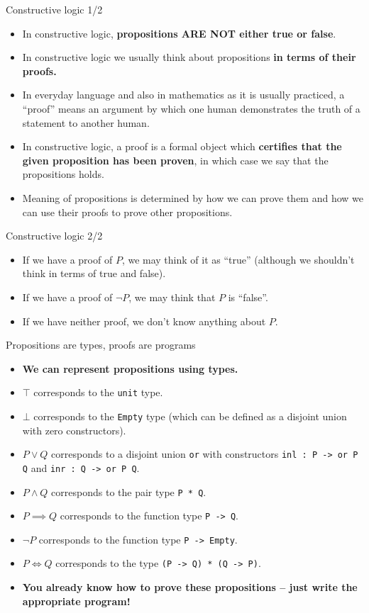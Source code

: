 \documentclass{beamer}
\newcommand{\m}[1]{\texttt{#1}}
\begin{document}
\begin{frame}{Constructive logic 1/2}
\begin{itemize}
	\item In constructive logic, \textbf{propositions ARE NOT either true or false}.
	\item In constructive logic we usually think about propositions \textbf{in terms of their proofs.}
	\item In everyday language and also in mathematics as it is usually practiced, a ``proof'' means an argument by which one human demonstrates the truth of a statement to another human.
	\item In constructive logic, a proof is a formal object which \textbf{certifies that the given proposition has been proven}, in which case we say that the propositions holds.
	\item Meaning of propositions is determined by how we can prove them and how we can use their proofs to prove other propositions.
\end{itemize}
\end{frame}

\begin{frame}{Constructive logic 2/2}
\begin{itemize}
	\item If we have a proof of $P$, we may think of it as ``true'' (although we shouldn't think in terms of true and false).
	\item If we have a proof of $\neg P$, we may think that $P$ is ``false''.
	\item If we have neither proof, we don't know anything about $P$.
\end{itemize}
\end{frame}

\begin{frame}{Propositions are types, proofs are programs}
\begin{itemize}
	\item \textbf{We can represent propositions using types.}
	\item $\top$ corresponds to the \m{unit} type.
	\item $\bot$ corresponds to the \m{Empty} type (which can be defined as a disjoint union with zero constructors).
	\item $P \lor Q$ corresponds to a disjoint union \m{or} with constructors \m{inl :\ P -> or P Q} and \m{inr :\ Q -> or P Q}.
	\item $P \land Q$ corresponds to the pair type \m{P * Q}.
	\item $P \implies Q$ corresponds to the function type \m{P -> Q}.
	\item $\neg P$ corresponds to the function type \m{P -> Empty}.
	\item $P \iff Q$ corresponds to the type \m{(P -> Q) * (Q -> P)}.
	\item \textbf{You already know how to prove these propositions -- just write the appropriate program!}
\end{itemize}
\end{frame}
\end{document}
